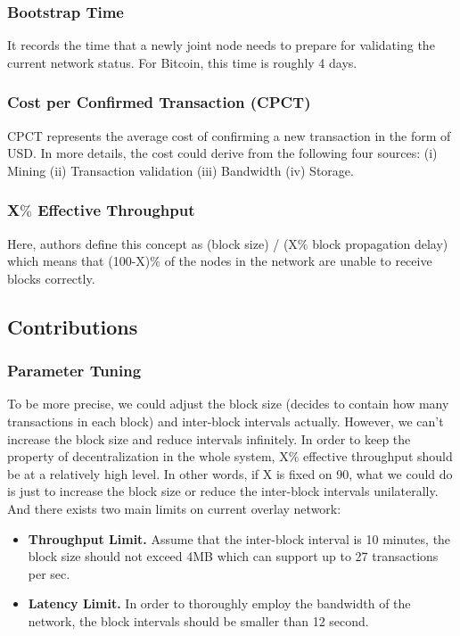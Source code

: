 \documentclass[conference]{IEEEtran}
\begin{document}
\subsubsection{Bootstrap Time} It records the time that a newly joint node needs to prepare for validating the current network status. For Bitcoin, this time is roughly 4 days.

\subsubsection{Cost per Confirmed Transaction (CPCT)} CPCT represents the average cost of confirming a new transaction in the form of USD. 
%
In more details, the cost could derive from the following four sources: (i) Mining (ii) Transaction validation (iii) Bandwidth (iv) Storage.

\subsubsection{X$\%$ Effective Throughput} Here, authors define this concept as (block size) / (X$\%$ block propagation delay) which means that (100-X)$\%$ of the nodes in the network are unable to receive blocks correctly.


\subsection{Contributions}

\subsubsection{Parameter Tuning} 
To be more precise, we could adjust the block size (decides to contain how many transactions in each block) and inter-block intervals actually. 
%
However, we can't increase the block size and reduce intervals infinitely.
%
In order to keep the property of decentralization in the whole system, X$\%$ effective throughput should be at a relatively high level.
%
In other words, if X is fixed on 90, what we could do is just to increase the block size or reduce the inter-block intervals unilaterally.
%
And there exists two main limits on current overlay network:

\begin{itemize}
    \item \textbf{Throughput Limit.} Assume that the inter-block interval is 10 minutes, the block size should not exceed 4MB which can support up to 27 transactions per sec.
    \item \textbf{Latency Limit.} In order to thoroughly employ the bandwidth of the network, the block intervals should be smaller than 12 second.
\end{itemize}
\end{document}

